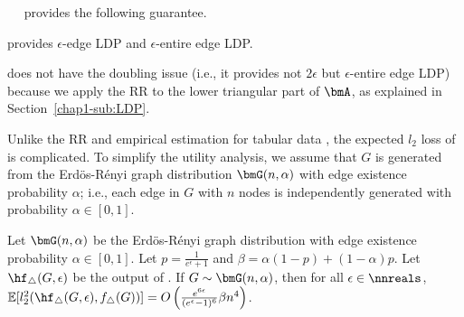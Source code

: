 \smallskip
{}~~ 
provides the following guarantee.

\begin{theorem}\label{chap1-thm:subgraph-rr_LDP}
   provides $\epsilon$-edge LDP and $\epsilon$-entire edge LDP.
\end{theorem}

 does not have the doubling issue (i.e., it provides not $2\epsilon$ but $\epsilon$-entire edge LDP) because we apply the RR to the lower triangular part of $\bmA$, as explained in Section~\ref{chap1-sub:LDP}.

Unlike the RR and empirical estimation for tabular data \cite{Kairouz_ICML16}, the expected $l_2$ loss of  is complicated. 
To simplify the utility analysis, we assume that $G$ is generated from the Erd\"os-R\'enyi graph distribution $\bmG(n,\alpha)$ with edge existence probability $\alpha$; i.e., each edge in $G$ with $n$ nodes is independently generated with probability $\alpha \in [0,1]$.

\begin{theorem}\label{chap1-thm:subgraph-rr}
  Let $\bmG(n,\alpha)$ be the Erd\"os-R\'enyi graph distribution with edge existence probability $\alpha \in [0,1]$. 
  Let $p = \frac{1}{e^\epsilon+1}$ and 
  $\beta = \alpha(1-p) + (1-\alpha)p$. 
  Let 
  $\hf_{\triangle}(G, \epsilon)$ 
  be the output of 
  .
  If 
  $G \sim \bmG(n,\alpha)$, 
  then for all 
  $\epsilon \in \nnreals$, 
  $\mathbb{E}[l_2^2(\hf_{\triangle}(G, \epsilon),
  f_\triangle(G))] = 
  O\left(\frac{e^{6\epsilon}}{(e^\epsilon-1)^6}\beta n^4\right)$.
\end{theorem}


